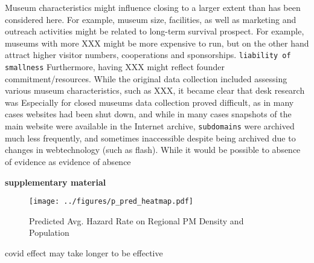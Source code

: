 \documentclass[12pt]{article}
\begin{document}
Museum characteristics might influence closing to a larger extent than has been considered here.
For example, museum size, facilities, as well as marketing and outreach activities might be related to long-term survival prospect.
For example, museums with more XXX might be more expensive to run, but on the other hand attract higher visitor numbers, cooperations and sponsorships. \texttt{liability of smallness}
Furthermore, having XXX might reflect founder commitment/resources.
While the original data collection included assessing various museum characteristics, such as XXX, it became clear that desk research was
Especially for closed museums data collection proved difficult, as in many cases websites had been shut down, and while in many cases snapshots of the main website were available in the Internet archive, \texttt{subdomains} were archived much less frequently, and sometimes inaccessible despite being archived due to changes in webtechnology (such as flash).
While it would be possible to
absence of evidence as evidence of absence

\textbf{supplementary material}





\begin{figure}[htbp]
\centering
\texttt{[image: ../figures/p\_pred\_heatmap.pdf]}
\caption{\label{fig:p_pred_heatmap}Predicted Avg. Hazard Rate on Regional PM Density and Population}
\end{figure}



covid effect may take longer to be effective
\end{document}
